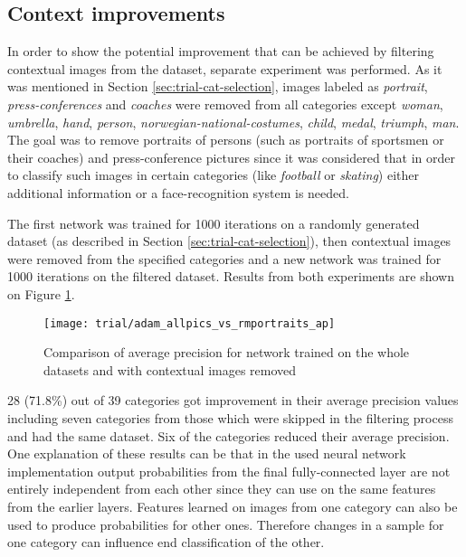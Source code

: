 \subsection{Context improvements}
    In order to show the potential improvement that can be achieved by filtering contextual images from the dataset, separate experiment was performed. As it was mentioned in Section \ref{sec:trial-cat-selection}, images labeled as \textit{portrait}, \textit{press-conferences} and \textit{coaches} were removed from all categories except \textit{woman}, \textit{umbrella}, \textit{hand}, \textit{person}, \textit{norwegian-national-costumes}, \textit{child}, \textit{medal}, \textit{triumph}, \textit{man}. The goal was to remove portraits of persons (such as portraits of sportsmen or their coaches) and press-conference pictures since it was considered that in order to classify such images in certain categories (like \textit{football} or \textit{skating}) either additional information or a face-recognition system is needed.
    
    The first network was trained for 1000 iterations on a randomly generated dataset (as described in Section \ref{sec:trial-cat-selection}), then contextual images were removed from the specified categories and a new network was trained for 1000 iterations on the filtered dataset. Results from both experiments are shown on Figure \ref{fig:trial-allpics-vs-rmportraits}.
    
    \begin{figure}[H]
        \centering
        \texttt{[image: trial/adam\_allpics\_vs\_rmportraits\_ap]}
        \caption[Trial experiment. Average precision for all images vs contextual removed]{Comparison of average precision for network trained on the whole datasets and with contextual images removed}
        \label{fig:trial-allpics-vs-rmportraits}
    \end{figure}
    
    28 (71.8\%) out of 39 categories got improvement in their average precision values including seven categories from those which were skipped in the filtering process and had the same dataset. Six of the categories reduced their average precision. One explanation of these results can be that in the used neural network implementation output probabilities from the final fully-connected layer are not entirely independent from each other since they can use on the same features from the earlier layers. Features learned on images from one category can also be used to produce probabilities for other ones. Therefore changes in a sample for one category can influence end classification of the other.
    
